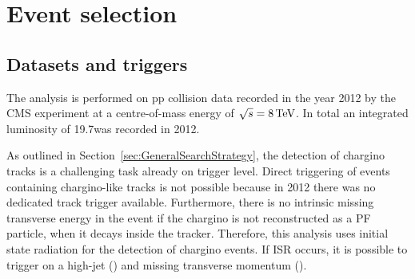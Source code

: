 \clearpage
\FloatBarrier
\chapter{Event selection}
\label{sec:EventSelection}
\section{Datasets and triggers}
\label{sec:DatasetsAndTriggers}

The analysis is performed on pp collision data recorded in the year 2012 by the CMS experiment at a centre-of-mass energy of $\sqrt{s}=8\,\text{Te}\kern-0.06667em\text{V}$.
In total an integrated luminosity of 19.7\fbinv was recorded in 2012.

As outlined in Section~\ref{sec:GeneralSearchStrategy}, the detection of chargino tracks is a challenging task already on trigger level.
Direct triggering of events containing chargino-like tracks is not possible because in 2012 there was no dedicated track trigger available.
Furthermore, there is no intrinsic missing transverse energy in the event if the chargino is not reconstructed as a PF particle, \eg when it decays inside the tracker.
Therefore, this analysis uses initial state radiation for the detection of chargino events.
If ISR occurs, it is possible to trigger on a high-\pt jet (\ptfirstjet) and missing transverse momentum (\met).


